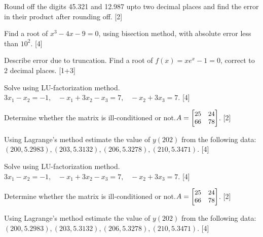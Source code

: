 \documentclass[12pt]{exam}
\begin{document}
\begin{questions}

\question Round off the digits 45.321 and 12.987 upto two decimal places and find the error in their product after rounding off. [2]

\question Find a root of $x^3-4x-9=0$, using bisection method, with absolute error less than $10^2$. [4]

\question Describe error due to truncation. Find a root of \(f(x)=xe^x-1=0\), correct to \(2\) decimal places. [1+3]
\end{questions}

  \clearpage

\vspace{4cm}
\begin{questions}
\question Solve using LU-factorization method. $3x_1 - x_2 = -1, \;\;\; -x_1+3x_2-x_3 = 7, \;\;\; -x_2+3x_3 =7$. [4]

\question Determine whether the matrix is ill-conditioned or not.$\small A=   \begin{bmatrix}
    25  & 24 \\
    66 & 78 \\
  \end{bmatrix}$. [2]

\question Using Lagrange's method estimate the value of $y(202)$ from the following data: \\[2mm]
  $(200, 5.2983), (203,5.3132), (206,5.3278), (210,5.3471)$. [4]
  \vspace{12cm}

 \question Solve using LU-factorization method. $3x_1 - x_2 = -1, \;\;\; -x_1+3x_2-x_3 = 7, \;\;\; -x_2+3x_3 =7$. [4]

\question Determine whether the matrix is ill-conditioned or not.$\small A=   \begin{bmatrix}
    25  & 24 \\
    66 & 78 \\
  \end{bmatrix}$. [2]

\question Using Lagrange's method estimate the value of $y(202)$ from the following data: \\[1mm]
  $(200, 5.2983), (203,5.3132), (206,5.3278), (210,5.3471)$. [4]


\end{questions}
\end{document}
